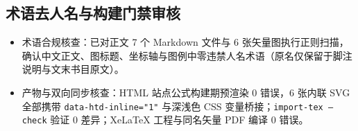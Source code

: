 \subsection{术语去人名与构建门禁审核}\label{sec:audit-gates}

\begin{itemize}
\item 术语合规核查：已对正文 7 个 Markdown 文件与 6 张矢量图执行正则扫描，确认中文正文、图标题、坐标轴与图例中零违禁人名术语（原名仅保留于脚注说明与文末书目原文）。
\item 产物与双向同步核查：HTML 站点公式构建期预渲染 0 错误，6 张内联 SVG 全部携带 \texttt{data-htd-inline="1"} 与深浅色 CSS 变量桥接；\texttt{import-tex --check} 验证 0 差异；XeLaTeX 工程与同名矢量 PDF 编译 0 错误。
\end{itemize}
